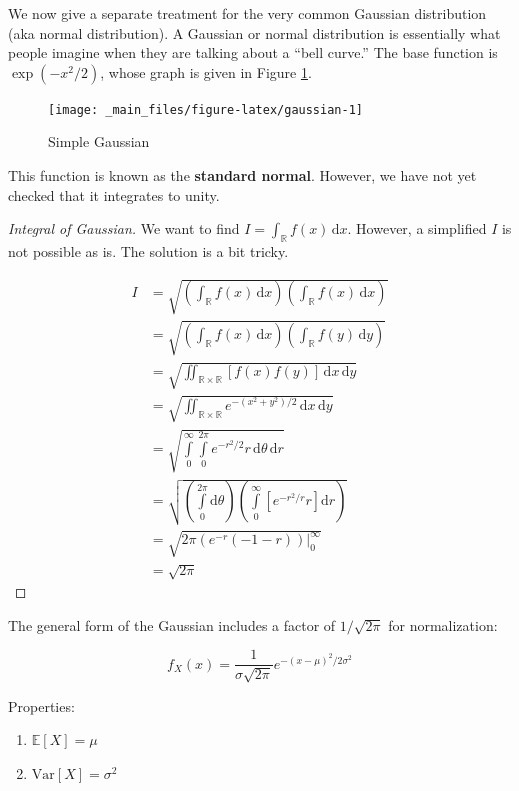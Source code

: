 \documentclass[13pt,oneside]{tufte-book}
\providecommand{\tightlist}{%
  \setlength{\itemsep}{0pt}\setlength{\parskip}{0pt}}
\theoremstyle{definition}
\theoremstyle{definition}
\theoremstyle{definition}
\theoremstyle{remark}
\let\BeginKnitrBlock\begin \let\EndKnitrBlock\end
\begin{document}
We now give a separate treatment for the very common Gaussian
distribution (aka normal distribution). A Gaussian or normal
distribution is essentially what people imagine when they are talking
about a ``bell curve.'' The base function is \(\exp(-x^2/2)\), whose
graph is given in Figure \ref{fig:gaussian}.

\begin{figure}
\texttt{[image: \_main\_files/figure-latex/gaussian-1]} \caption[Simple Gaussian]{Simple Gaussian}\label{fig:gaussian}
\end{figure}

This function is known as the \textbf{standard normal}. However, we have
not yet checked that it integrates to unity.

\BeginKnitrBlock{proof}[Integral of Gaussian]
{} We want to find
\(I = \int_\mathbb{R} f(x)\,\mathrm{d}x\). However, a simplified \(I\)
is not possible as is. The solution is a bit tricky.

\begin{align*}
I &= \sqrt{\left(\int_\mathbb{R} f(x)\,\mathrm{d}x\right)\left( \int_\mathbb{R} f(x)\,\mathrm{d}x \right)} \\
&= \sqrt{\left(\int_\mathbb{R} f(x)\,\mathrm{d}x\right)\left( \int_\mathbb{R} f(y)\,\mathrm{d}y \right)} \\
&= \sqrt{\iint_{\mathbb{R}\times\mathbb{R}} \left[ f(x)f(y) \right] \,\mathrm{d}x\,\mathrm{d}y } \\
&= \sqrt{\iint_{\mathbb{R}\times\mathbb{R}} e^{-(x^2+y^2)/2}\,\mathrm{d}x\, \mathrm{d}y} \\
&= \sqrt{\int\limits_0^\infty\int\limits_0^{2\pi} e^{-r^2/2}r\,\mathrm{d}\theta\,\mathrm{d}r } \\
&= \sqrt{\left(\int\limits_0^{2\pi}\mathrm{d}\theta \right)\left(\int\limits_0^\infty \left[e^{-r^2/r}r\right]\mathrm{d}r\right) } \\
&= \sqrt{2\pi \left(e^{-r}\left(-1-r\right)\right)\Big|_{0}^{\infty} } \\
&= \sqrt{2\pi}
\end{align*}
\EndKnitrBlock{proof}

The general form of the Gaussian includes a factor of \(1/\sqrt{2\pi}\)
for normalization:

\[
f_X(x) = \frac{1}{\sigma\sqrt{2\pi}}e^{-(x-\mu)^2/2\sigma^2}
\]

Properties:

\begin{enumerate}
\def\labelenumi{\arabic{enumi}.}
\tightlist
\item
  \(\mathbb{E}[X] = \mu\)
\item
  \(\mathrm{Var}[X] = \sigma^2\)
\end{enumerate}
\end{document}
